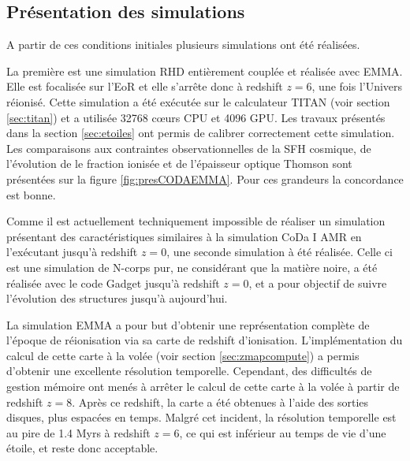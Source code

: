 
\subsection{Présentation des simulations}
\label{sec:presCODA}

A partir de ces conditions initiales plusieurs simulations ont été réalisées.

La première est une simulation \ac{RHD} entièrement couplée et réalisée avec EMMA.
Elle est focalisée sur l'\ac{EoR} et elle s’arrête donc à redshift $z=6$, une fois l'Univers réionisé.
Cette simulation a été exécutée sur le calculateur TITAN (voir section \ref{sec:titan}) et a utilisée 32768 cœurs \ac{CPU} et 4096 \ac{GPU}.
Les travaux présentés dans la section \ref{sec:etoiles} ont permis de calibrer correctement cette simulation.
Les comparaisons aux contraintes observationnelles de la \ac{SFH} cosmique, de l'évolution de le fraction ionisée et de l'épaisseur optique Thomson sont présentées sur la figure \ref{fig:presCODAEMMA}. 
Pour ces grandeurs la concordance est bonne.

Comme il est actuellement techniquement impossible de réaliser un simulation présentant des caractéristiques similaires à la simulation \ac{CoDa} I \ac{AMR} en l'exécutant jusqu’à redshift $z=0$, une seconde simulation à été réalisée.
Celle ci est une simulation de N-corps pur, ne considérant que la matière noire, a été réalisée avec le code Gadget \citep{springel_cosmological_2005} jusqu'à redshift $z=0$, et a pour objectif de suivre l'évolution des structures jusqu'à aujourd'hui.

La simulation EMMA a pour but d'obtenir une représentation complète de l'époque de réionisation via sa carte de redshift d'ionisation.
L'implémentation du calcul de cette carte à la volée (voir section \ref{sec:zmapcompute}) a permis d'obtenir une excellente résolution temporelle.
Cependant, des difficultés de gestion mémoire ont menés à arrêter le calcul de cette carte à la volée à partir de redshift $z=8$.
Après ce redshift, la carte a été obtenues à l'aide des sorties disques, plus espacées en temps.
Malgré cet incident, la résolution temporelle est au pire de 1.4 Myrs à redshift $z=6$, ce qui est inférieur au temps de vie d'une étoile, et reste donc acceptable.


